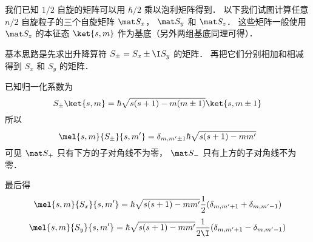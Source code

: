 

我们已知 $1/2$ 自旋的矩阵可以用 $\hbar/2$ 乘以泡利矩阵得到． 以下我们试图计算任意 $n/2$ 自旋粒子的三个自旋矩阵 $\mat S_x$， $\mat S_y$ 和 $\mat S_z$． 这些矩阵一般使用 $\mat S_z$ 的本征态 $\ket{s, m}$ 作为基底（另外两组基底同理可得）．

基本思路是先求出升降算符 $S_\pm = S_x \pm \I S_y$ 的矩阵． 再把它们分别相加和相减得到 $S_x$ 和 $S_y$ 的矩阵．

已知归一化系数为
\begin{equation}
S_\pm \ket{s,m} = \hbar \sqrt{s(s + 1) - m(m \pm 1)} \ket{s,m\pm1}
\end{equation}
所以
\begin{equation}
\mel{s,m}{S_\pm}{s,m'} = \delta_{m, m'\pm1} \hbar \sqrt{s(s + 1) - mm'}
\end{equation}
可见 $\mat S_+$ 只有下方的子对角线不为零， $\mat S_-$ 只有上方的子对角线不为零．

最后得
\begin{equation}
\mel{s,m}{S_x}{s,m'} = \hbar \sqrt{s(s + 1) - mm'} \frac12(\delta_{m, m'+1} + \delta_{m, m'-1})
\end{equation}
\begin{equation}
\mel{s,m}{S_y}{s,m'} = \hbar \sqrt{s(s + 1) - mm'} \frac{1}{2\I}(\delta_{m, m'+1} - \delta_{m, m'-1})
\end{equation}
